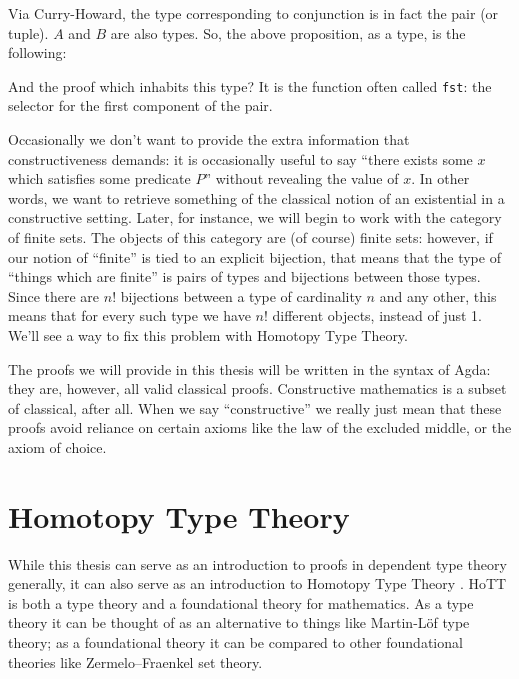 Via Curry-Howard, the type corresponding to conjunction is in fact the pair (or
tuple).
\(A\) and \(B\) are also types.
So, the above proposition, as a type, is the following:
\begin{agdalisting*}
   \vspace{-\baselineskip}
\end{agdalisting*}
And the proof which inhabits this type?
It is the function often called \verb+fst+: the selector for the first component
of the pair.
\begin{agdalisting*}
   \vspace{-\baselineskip}
\end{agdalisting*}

Occasionally we don't want to provide the extra information that
constructiveness demands: it is occasionally useful to say ``there exists some
\(x\) which satisfies some predicate \(P\)'' without revealing the value of \(x\).
In other words, we want to retrieve something of the classical notion of an
existential in a constructive setting.
Later, for instance, we will begin to work with the
category of finite sets.
The objects of this category are (of course) finite sets: however, if our notion
of ``finite'' is tied to an explicit bijection, that means that the type of
``things which are finite'' is pairs of types and bijections between those
types. 
Since there are \(n!\) bijections between a type of cardinality \(n\) and any
other, this means that for every such type we have \(n!\) different objects,
instead of just 1.
We'll see a way to fix this problem with Homotopy Type Theory.

The proofs we will provide in this thesis will be written in the syntax of
Agda: they are, however, all valid classical proofs.
Constructive mathematics is a subset of classical, after all.
When we say ``constructive'' we really just mean that these proofs avoid
reliance on certain axioms like the law of the excluded middle, or the axiom of
choice.
\section{Homotopy Type Theory}
While this thesis can serve as an introduction to proofs in dependent type
theory generally, it can also serve as an introduction to Homotopy Type Theory
\citep{hottbook}.
HoTT is both a type theory and a foundational theory for mathematics.
As a type theory it can be thought of as an alternative to things like
Martin-Löf type theory; as a foundational theory it can be compared to other
foundational theories like Zermelo–Fraenkel set theory.

